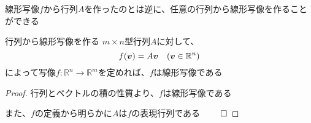 \documentclass[../../../topic_linear-algebra]{subfiles}
\begin{document}
\sectionline

線形写像$f$から行列$A$を作ったのとは逆に、任意の行列から線形写像を作ることができる

\begin{theorem*}{行列から線形写像を作る}
  $m \times n$型行列$A$に対して、
  \begin{equation*}
    f(\vb*{v}) = A\vb*{v} \quad (\vb*{v} \in \mathbb{R}^n)
  \end{equation*}
  によって写像$f\colon \mathbb{R}^n \to \mathbb{R}^m$を定めれば、$f$は線形写像である
\end{theorem*}

\begin{proof}
  行列とベクトルの積の性質より、$f$は線形写像である

  また、$f$の定義から明らかに$A$は$f$の表現行列である $\qed$
\end{proof}
\end{document}
